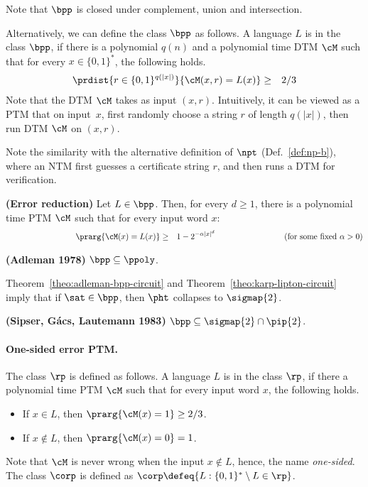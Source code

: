 \documentclass[11pt, a4paper]{article}
\begin{document}
Note that $\bpp$ is closed under complement, union and intersection.

\begin{remark}
Alternatively, we can define the class $\bpp$ as follows.
A language $L$ is in the class $\bpp$, if 
there is a polynomial $q(n)$ and a polynomial time DTM $\cM$
such that for every $x\in \{0,1\}^*$, the following holds.
\begin{eqnarray*}
\prdist {r\in \{0,1\}^{q(|x|)}} { \cM(x,r)=L(x) } & \geq & 2/3
\end{eqnarray*}
Note that the DTM $\cM$ takes as input $(x,r)$.
Intuitively, it can be viewed as a PTM that on input~$x$, 
first randomly choose a string $r$ of length $q(|x|)$, then run DTM $\cM$ on $(x,r)$.

Note the similarity with the alternative definition of $\npt$ (Def.~\ref{def:np-b}),
where an NTM first guesses a certificate string $r$,
and then runs a DTM for verification.
\end{remark}





\begin{theorem}
{\bf (Error reduction)}
Let $L \in \bpp$.
Then, for every $d\geq 1$,
there is a polynomial time PTM $\cM$ such that for every input word $x$:
\begin{eqnarray*}
\hspace{3cm}\prarg {\cM(x)=L(x)} & \geq & 1- 2^{-\alpha |x|^d}\hspace{3cm}(\text{for some fixed}\ \alpha>0)
\end{eqnarray*}
\end{theorem}

\begin{theorem}
\label{theo:adleman-bpp-circuit}
{\bf (Adleman 1978)}
$\bpp \subseteq \ppoly$.
\end{theorem}

Theorem~\ref{theo:adleman-bpp-circuit} and Theorem~\ref{theo:karp-lipton-circuit} imply that
if $\sat \in \bpp$, then $\pht$ collapses to $\sigmap {2}$.

\begin{theorem}
\label{theo:bpp-ph}
{\bf (Sipser, G\'acs, Lautemann 1983)}
$\bpp \subseteq \sigmap {2} \cap \pip {2}$.
\end{theorem}

\paragraph*{One-sided error PTM.}
The class $\rp$ is defined as follows.
A language $L$ is in the class $\rp$, if there a polynomial time PTM $\cM$ such that
for every input word $x$, the following holds.
\begin{itemize}
\item
If $x\in L$, then $\prarg {\cM(x)=1} \geq 2/3$.
\item
If $x\notin L$, then $\prarg {\cM(x)=0} =1$.
\end{itemize}
Note that $\cM$ is never wrong when the input $x\notin L$,
hence, the name {\em one-sided}.
The class $\corp$ is defined as $\corp \defeq \{L : \{0,1\}^*\setminus L \in \rp\}$.
\end{document}
